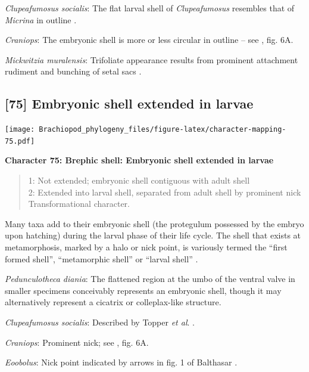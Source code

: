 \documentclass[openany]{book}
\theoremstyle{definition}
\theoremstyle{definition}
\theoremstyle{definition}
\theoremstyle{remark}
\begin{document}
\emph{Clupeafumosus socialis}: The flat larval shell of
\emph{Clupeafumosus} resembles that of \emph{Micrina} in outline
\citetext{\citealp{Topper2013Reappraisalof}; \citealp[cf.][]{Holmer2011Firstrecord}}.

\emph{Craniops}: The embryonic shell is more or less circular in outline
-- see \citet{Freeman1999Changesin}, fig. 6A.

\emph{Mickwitzia muralensis}: Trifoliate appearance results from
prominent attachment rudiment and bunching of setal sacs
\citep{Balthasar2009Thebrachiopod}.

\hypertarget{embryonic-shell-extended-in-larvae}{%
\subsection*{{[}75{]} Embryonic shell extended in
larvae}\label{embryonic-shell-extended-in-larvae}}

\texttt{[image: Brachiopod\_phylogeny\_files/figure-latex/character-mapping-75.pdf]}

\textbf{Character 75: Brephic shell: Embryonic shell extended in larvae}

\begin{quote}
1: Not extended; embryonic shell contiguous with adult shell\\
2: Extended into larval shell, separated from adult shell by prominent
nick\\
Transformational character.
\end{quote}

Many taxa add to their embryonic shell (the protegulum possessed by the
embryo upon hatching) during the larval phase of their life cycle. The
shell that exists at metamorphosis, marked by a halo or nick point, is
variously termed the ``first formed shell'', ``metamorphic shell'' or
``larval shell'' \citep{Bassett2017Earliestontogeny}.

\emph{Pedunculotheca diania}: The flattened region at the umbo of the
ventral valve in smaller specimens conceivably represents an embryonic
shell, though it may alternatively represent a cicatrix or
colleplax-like structure.

\emph{Clupeafumosus socialis}: Described by Topper \emph{et al}.
\citeyearpar{Topper2013Reappraisalof}.

\emph{Craniops}: Prominent nick; see \citet{Freeman1999Changesin}, fig.
6A.

\emph{Eoobolus}: Nick point indicated by arrows in fig. 1 of Balthasar
\citeyearpar{Balthasar2009Thebrachiopod}.
\end{document}
